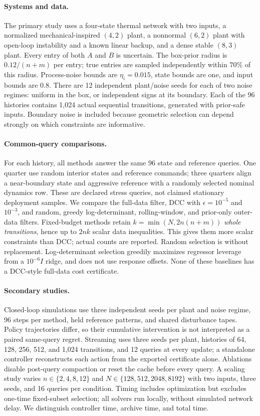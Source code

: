 \documentclass{l4dc2026}
\begin{document}
\paragraph{Systems and data.}
The primary study uses a four-state thermal network with two inputs, a normalized mechanical-inspired $(4,2)$ plant, a nonnormal $(6,2)$ plant with open-loop instability and a known linear backup, and a dense stable $(8,3)$ plant. Every entry of both $A$ and $B$ is uncertain. The box-prior radius is $0.12/(n+m)$ per entry; true entries are sampled independently within $70\%$ of this radius. Process-noise bounds are $\eta_i=0.015$, state bounds are one, and input bounds are $0.8$. There are 12 independent plant/noise seeds for each of two noise regimes: uniform in the box, or independent signs at its boundary. Each of the 96 histories contains 1,024 actual sequential transitions, generated with prior-safe inputs. Boundary noise is included because geometric selection can depend strongly on which constraints are informative.

\paragraph{Common-query comparisons.}
For each history, all methods answer the same 96 state and reference queries. One quarter use random interior states and reference commands; three quarters align a near-boundary state and aggressive reference with a randomly selected nominal dynamics row. These are declared stress queries, not claimed stationary deployment samples. We compare the full-data filter, DCC with $\epsilon=10^{-5}$ and $10^{-3}$, and random, greedy log-determinant, rolling-window, and prior-only outer-data filters. Fixed-budget methods retain $k=\min(N,2n(n+m))$ \emph{whole transitions}, hence up to $2nk$ scalar data inequalities. This gives them more scalar constraints than DCC; actual counts are reported. Random selection is without replacement. Log-determinant selection greedily maximizes regressor leverage from a $10^{-6}I$ ridge, and does not use response offsets. None of these baselines has a DCC-style full-data cost certificate.

\paragraph{Secondary studies.}
Closed-loop simulations use three independent seeds per plant and noise regime, 96 steps per method, held reference patterns, and shared disturbance tapes. Policy trajectories differ, so their cumulative intervention is not interpreted as a paired same-query regret. Streaming uses three seeds per plant, histories of 64, 128, 256, 512, and 1,024 transitions, and 12 queries at every update; a standalone controller reconstructs each action from the exported certificate alone. Ablations disable post-query compaction or reset the cache before every query. A scaling study varies $n\in\{2,4,8,12\}$ and $N\in\{128,512,2048,8192\}$ with two inputs, three seeds, and 16 queries per condition. Timing includes optimization but excludes one-time fixed-subset selection; all solvers run locally, without simulated network delay. We distinguish controller time, archive time, and total time.
\end{document}
